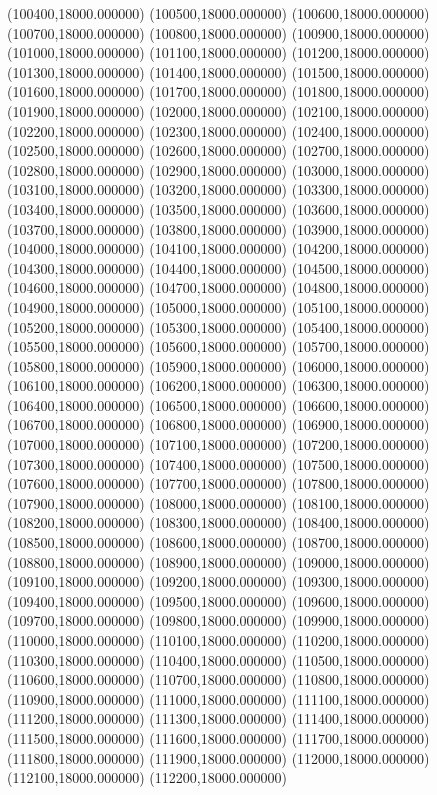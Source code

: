 (100400,18000.000000)
(100500,18000.000000)
(100600,18000.000000)
(100700,18000.000000)
(100800,18000.000000)
(100900,18000.000000)
(101000,18000.000000)
(101100,18000.000000)
(101200,18000.000000)
(101300,18000.000000)
(101400,18000.000000)
(101500,18000.000000)
(101600,18000.000000)
(101700,18000.000000)
(101800,18000.000000)
(101900,18000.000000)
(102000,18000.000000)
(102100,18000.000000)
(102200,18000.000000)
(102300,18000.000000)
(102400,18000.000000)
(102500,18000.000000)
(102600,18000.000000)
(102700,18000.000000)
(102800,18000.000000)
(102900,18000.000000)
(103000,18000.000000)
(103100,18000.000000)
(103200,18000.000000)
(103300,18000.000000)
(103400,18000.000000)
(103500,18000.000000)
(103600,18000.000000)
(103700,18000.000000)
(103800,18000.000000)
(103900,18000.000000)
(104000,18000.000000)
(104100,18000.000000)
(104200,18000.000000)
(104300,18000.000000)
(104400,18000.000000)
(104500,18000.000000)
(104600,18000.000000)
(104700,18000.000000)
(104800,18000.000000)
(104900,18000.000000)
(105000,18000.000000)
(105100,18000.000000)
(105200,18000.000000)
(105300,18000.000000)
(105400,18000.000000)
(105500,18000.000000)
(105600,18000.000000)
(105700,18000.000000)
(105800,18000.000000)
(105900,18000.000000)
(106000,18000.000000)
(106100,18000.000000)
(106200,18000.000000)
(106300,18000.000000)
(106400,18000.000000)
(106500,18000.000000)
(106600,18000.000000)
(106700,18000.000000)
(106800,18000.000000)
(106900,18000.000000)
(107000,18000.000000)
(107100,18000.000000)
(107200,18000.000000)
(107300,18000.000000)
(107400,18000.000000)
(107500,18000.000000)
(107600,18000.000000)
(107700,18000.000000)
(107800,18000.000000)
(107900,18000.000000)
(108000,18000.000000)
(108100,18000.000000)
(108200,18000.000000)
(108300,18000.000000)
(108400,18000.000000)
(108500,18000.000000)
(108600,18000.000000)
(108700,18000.000000)
(108800,18000.000000)
(108900,18000.000000)
(109000,18000.000000)
(109100,18000.000000)
(109200,18000.000000)
(109300,18000.000000)
(109400,18000.000000)
(109500,18000.000000)
(109600,18000.000000)
(109700,18000.000000)
(109800,18000.000000)
(109900,18000.000000)
(110000,18000.000000)
(110100,18000.000000)
(110200,18000.000000)
(110300,18000.000000)
(110400,18000.000000)
(110500,18000.000000)
(110600,18000.000000)
(110700,18000.000000)
(110800,18000.000000)
(110900,18000.000000)
(111000,18000.000000)
(111100,18000.000000)
(111200,18000.000000)
(111300,18000.000000)
(111400,18000.000000)
(111500,18000.000000)
(111600,18000.000000)
(111700,18000.000000)
(111800,18000.000000)
(111900,18000.000000)
(112000,18000.000000)
(112100,18000.000000)
(112200,18000.000000)
